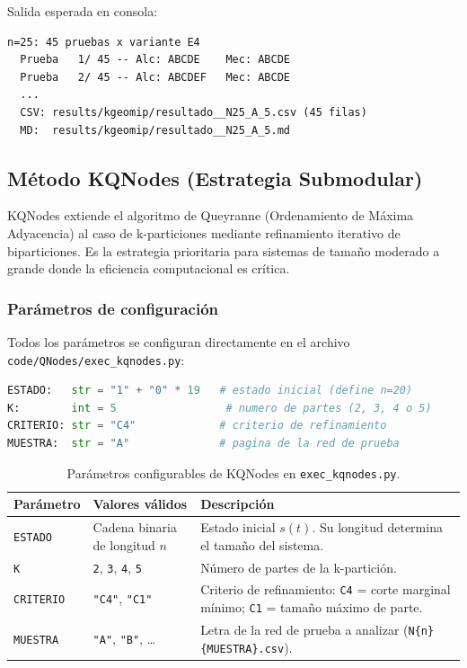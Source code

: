 Salida esperada en consola:

\begin{lstlisting}
n=25: 45 pruebas x variante E4
  Prueba   1/ 45 -- Alc: ABCDE    Mec: ABCDE
  Prueba   2/ 45 -- Alc: ABCDEF   Mec: ABCDE
  ...
  CSV: results/kgeomip/resultado__N25_A_5.csv (45 filas)
  MD:  results/kgeomip/resultado__N25_A_5.md
\end{lstlisting}

\subsection{Método KQNodes (Estrategia Submodular)}
\label{sec:kqnodes_ejecucion}

KQNodes extiende el algoritmo de Queyranne (Ordenamiento de Máxima Adyacencia)
al caso de k-particiones mediante refinamiento iterativo de biparticiones.
Es la estrategia prioritaria para sistemas de tamaño moderado a grande donde
la eficiencia computacional es crítica.

\subsubsection{Parámetros de configuración}

Todos los parámetros se configuran directamente en el archivo
\texttt{code/QNodes/exec\_kqnodes.py}:

\begin{lstlisting}[language=Python]
ESTADO:   str = "1" + "0" * 19   # estado inicial (define n=20)
K:        int = 5                 # numero de partes (2, 3, 4 o 5)
CRITERIO: str = "C4"             # criterio de refinamiento
MUESTRA:  str = "A"              # pagina de la red de prueba
\end{lstlisting}

\begin{table}[h!]
\centering
\begin{tabular}{|l|l|p{7cm}|}
\hline
\textbf{Parámetro} & \textbf{Valores válidos} & \textbf{Descripción} \\
\hline
\texttt{ESTADO}   & Cadena binaria de longitud $n$ & Estado inicial $s(t)$. Su longitud determina el tamaño del sistema. \\
\texttt{K}        & \texttt{2}, \texttt{3}, \texttt{4}, \texttt{5} & Número de partes de la k-partición. \\
\texttt{CRITERIO} & \texttt{"C4"}, \texttt{"C1"} & Criterio de refinamiento: \texttt{C4} = corte marginal mínimo; \texttt{C1} = tamaño máximo de parte. \\
\texttt{MUESTRA}  & \texttt{"A"}, \texttt{"B"}, \ldots & Letra de la red de prueba a analizar (\texttt{N\{n\}\{MUESTRA\}.csv}). \\
\hline
\end{tabular}
\caption{Parámetros configurables de KQNodes en \texttt{exec\_kqnodes.py}.}
\label{tab:params_kqnodes}
\end{table}

